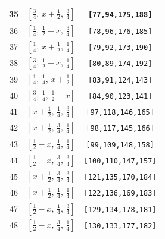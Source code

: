 \documentclass[fleqn,8pt]{jsarticle}
\begin{document}
\begin{longtable}{ccc}
35 & $\left[ \frac{3}{4},\, x + \frac{1}{2},\, \frac{3}{4} \right]$ & {\tt [77,94,175,188]} \\ \hline
36 & $\left[ \frac{1}{4},\, \frac{1}{2} - x,\, \frac{3}{4} \right]$ & {\tt [78,96,176,185]} \\ \hline
37 & $\left[ \frac{1}{4},\, x + \frac{1}{2},\, \frac{1}{4} \right]$ & {\tt [79,92,173,190]} \\ \hline
38 & $\left[ \frac{3}{4},\, \frac{1}{2} - x,\, \frac{1}{4} \right]$ & {\tt [80,89,174,192]} \\ \hline
39 & $\left[ \frac{1}{4},\, \frac{1}{4},\, x + \frac{1}{2} \right]$ & {\tt [83,91,124,143]} \\ \hline
40 & $\left[ \frac{3}{4},\, \frac{1}{4},\, \frac{1}{2} - x \right]$ & {\tt [84,90,123,141]} \\ \hline
41 & $\left[ x + \frac{1}{2},\, \frac{1}{4},\, \frac{3}{4} \right]$ & {\tt [97,118,146,165]} \\ \hline
42 & $\left[ x + \frac{1}{2},\, \frac{3}{4},\, \frac{1}{4} \right]$ & {\tt [98,117,145,166]} \\ \hline
43 & $\left[ \frac{1}{2} - x,\, \frac{1}{4},\, \frac{1}{4} \right]$ & {\tt [99,109,148,158]} \\ \hline
44 & $\left[ \frac{1}{2} - x,\, \frac{3}{4},\, \frac{3}{4} \right]$ & {\tt [100,110,147,157]} \\ \hline
45 & $\left[ x + \frac{1}{2},\, \frac{3}{4},\, \frac{3}{4} \right]$ & {\tt [121,135,170,184]} \\ \hline
46 & $\left[ x + \frac{1}{2},\, \frac{1}{4},\, \frac{1}{4} \right]$ & {\tt [122,136,169,183]} \\ \hline
47 & $\left[ \frac{1}{2} - x,\, \frac{1}{4},\, \frac{3}{4} \right]$ & {\tt [129,134,178,181]} \\ \hline
48 & $\left[ \frac{1}{2} - x,\, \frac{3}{4},\, \frac{1}{4} \right]$ & {\tt [130,133,177,182]} \\
\end{longtable}
\renewcommand{\arraystretch}{1.2}
\end{document}

